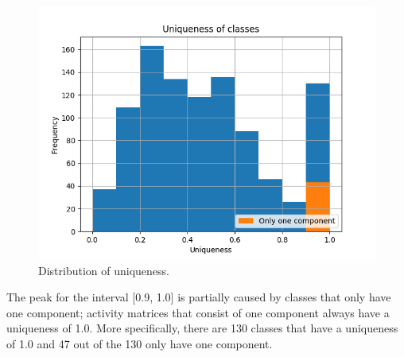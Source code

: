 \documentclass[twoside,a4paper,11pt]{memoir}
\begin{document}
\begin{figure}
    \centering
    \includegraphics[width=\linewidth]{figures/histogram_uniqueness}
    \caption{Distribution of uniqueness.}
    \label{fig:uniqueness}
\end{figure}

The peak for the interval [0.9, 1.0] is partially caused by classes that only have one component; activity matrices that consist of one component always have a uniqueness of 1.0.
More specifically, there are 130 classes that have a uniqueness of 1.0 and 47 out of the 130 only have one component.
\end{document}
